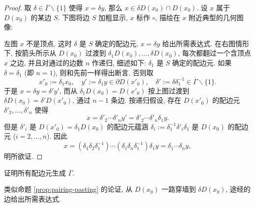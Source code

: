\begin{proof}
	取 $\delta \in \overline{\Gamma} \smallsetminus \{1\}$ 使得 $x = \delta y$, 那么 $x \in \delta D(x_0) \cap D(x_0)$. 设 $x$ 属于 $D(x_0)$ 的某边 $S$. 下图将边 $S$ 加粗显示, $x$ 标作 $\circ$, 描绘在 $x$ 附近典型的几何图像:
	\begin{center}\end{center}
	左图 $x$ 不是顶点, 这时 $\delta$ 是 $S$ 确定的配边元, $x = \delta y$ 给出所需表达式. 在右图情形下, 按箭头所示从 $D(x_0)$ 过渡到 $\delta_1 D(x_0), \ldots, \delta D(x_0)$, 每次都翻过一个含顶点 $x$ 之边, 并且对通过的边数 $n$ 作递归, 细述如下: $\delta_1$ 是 $S$ 确定的配边元. 如果 $\delta = \delta_1$ (即 $n=1$), 则和先前一样得出断言, 否则取
	\[ x'_0 := \delta_1 x_0, \quad y' := \delta_1 y \in \partial D(x'_0), \quad \delta' := \delta \delta_1^{-1} \in \overline{\Gamma} \smallsetminus \{1\}. \]
	于是 $x = \delta y = \delta' y'$, 而从 $\delta_1 D(x_0) = D(x'_0)$ 按上图过渡到 $\delta D(x_0) = \delta' D(x'_0)$, 通过 $n - 1$ 条边. 按递归假设, 存在 $D(x'_0)$ 的配边元 $\delta'_2, \ldots, \delta'_n$ 使得
	\[ x = \delta'_2 \cdots \delta'_n y' = \delta'_2 \cdots \delta'_n \delta_1 y. \]
	但是 $\delta'_i$ 是 $D(x'_0) = \delta_1 D(x_0)$ 的配边元蕴涵 $\delta_i := \delta_1^{-1} \delta'_i \delta_1$ 是 $D(x_0)$ 的配边元 ($i = 2, \ldots, n$). 因此
	\[ x = (\delta_1 \delta_2 \delta_1^{-1}) \cdots (\delta_1 \delta_n \delta_1^{-1}) \delta_1 y = \delta_1 \cdots \delta_n y, \]
	明所欲证.
\end{proof}


\begin{exercise}\label{exo:side-pairing-generation}
	证明所有配边元生成 $\overline{\Gamma}$.
	
	\begin{hint}
		类似命题 \ref{prop:pairing-pasting} 的论证, 从 $D(x_0)$ 一路穿墙到 $\delta D(x_0)$, 途经的边给出所需表达式.
	\end{hint}
\end{exercise}

